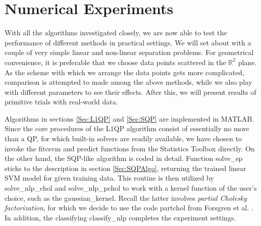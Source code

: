 \documentclass[11pt,a4paper]{article}
\theoremstyle{definition}
\begin{document}
  \section{Numerical Experiments\label{Sec:NumExp}}
    With all the algorithms investigated closely, we are now able to test the performance of different methods in practical settings. We will set about with a couple of very simple linear and non-linear separation problems. For geometrical convenience, it is preferable that we choose data points scattered in the $\mathbb{R}^{2}$ plane. As the scheme with which we arrange the data points gets more complicated, comparison is attempted to made among the above methods, while we also play with different parameters to see their effects. After this, we will present results of primitive trials with real-world data.

    Algorithms in sections \ref{Sec:L1QP} and \ref{Sec:SQP} are implemented in \textsf{MATLAB}. Since the core procedures of the L1QP algorithm consist of essentially no more than a QP, for which built-in solvers are readily available, we have chosen to invoke the \textsf{fitcsvm} and \textsf{predict} functions from the \textsf{Statistics Toolbox} directly. On the other hand, the SQP-like algorithm is coded in detail. Function \textsf{solve\_sp} sticks to the description in section \ref{Sec:SQPAlgo}, returning the trained linear SVM model for given training data. This routine is then utilized by \textsf{solve\_nlp\_chol} and \textsf{solve\_nlp\_pchol} to work with a kernel function of the user's choice, such as the \textsf{gaussian\_kernel}. Recall the latter involves \textit{partial Cholesky factorization}, for which we decide to use the code \textsf{partchol} from Forsgren et al. \cite{forsgren1995computing}. In addition, the classifying \textsf{classify\_nlp} completes the experiment settings.
\end{document}
